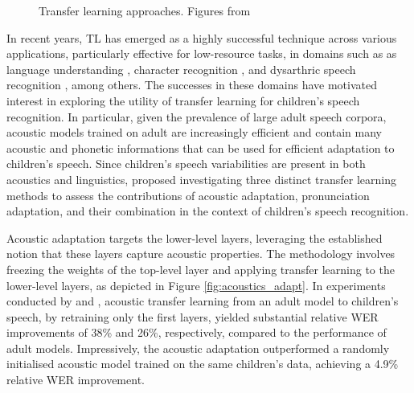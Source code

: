 \begin{figure}[t]
\centering
{}
\caption{Transfer learning approaches. Figures from \cite{TFchildren}}
\end{figure}

In recent years, \ac{TL} has emerged as a highly successful technique across various applications, particularly effective for low-resource tasks, in domains such as as language understanding \cite{Bert}, character recognition \cite{tfcharacter}, and dysarthric speech recognition \cite{tfpathology}, among others. The successes in these domains have motivated interest in exploring the utility of transfer learning for children's speech recognition. In particular, given the prevalence of large adult speech corpora, acoustic models trained on adult  are increasingly efficient and contain many acoustic and phonetic informations that can be used for efficient adaptation to children's speech. Since children's speech variabilities are present in both acoustics and linguistics, \cite{TFchildren} proposed investigating three distinct transfer learning methods to assess the contributions of acoustic adaptation, pronunciation adaptation, and their combination in the context of children's speech recognition.

Acoustic adaptation targets the lower-level layers, leveraging the established notion that these layers capture acoustic properties. The methodology involves freezing the weights of the top-level layer and applying transfer learning to the lower-level layers, as depicted in Figure \ref{fig:acoustics_adapt}. In experiments conducted by \cite{TFchildren} and \cite{TransferLF}, acoustic transfer learning from an adult model to children's speech, by retraining only the first layers, yielded substantial relative \ac{WER} improvements of 38\% and 26\%, respectively, compared to the performance of adult models. Impressively, the acoustic adaptation outperformed a randomly initialised acoustic model trained on the same children's data, achieving a 4.9\% relative \ac{WER} improvement.

